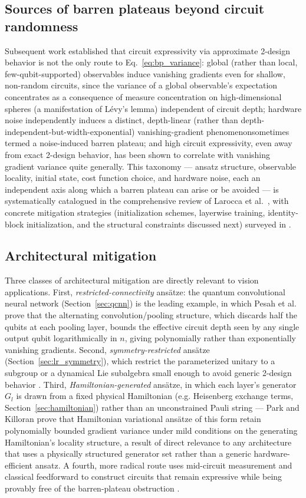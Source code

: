 \documentclass[11pt]{article}
\begin{document}
\subsection{Sources of barren plateaus beyond circuit randomness}
Subsequent work established that circuit expressivity via approximate 2-design behavior is not the only route to Eq.~\eqref{eq:bp_variance}: global (rather than local, few-qubit-supported) observables induce vanishing gradients even for shallow, non-random circuits, since the variance of a global observable's expectation concentrates as a consequence of measure concentration on high-dimensional spheres (a manifestation of L\'evy's lemma) independent of circuit depth; hardware noise independently induces a distinct, depth-linear (rather than depth-independent-but-width-exponential) vanishing-gradient phenomenonsometimes termed a noise-induced barren plateau; and high circuit expressivity, even away from exact 2-design behavior, has been shown to correlate with vanishing gradient variance quite generally. This taxonomy — ansatz structure, observable locality, initial state, cost function choice, and hardware noise, each an independent axis along which a barren plateau can arise or be avoided — is systematically catalogued in the comprehensive review of Larocca et al.\ \cite{Larocca2025}, with concrete mitigation strategies (initialization schemes, layerwise training, identity-block initialization, and the structural constraints discussed next) surveyed in \cite{Cunningham2024}.

\subsection{Architectural mitigation}
Three classes of architectural mitigation are directly relevant to vision applications. First, \emph{restricted-connectivity} ansätze: the quantum convolutional neural network (Section~\ref{sec:qcnn}) is the leading example, in which Pesah et al.\ \cite{Pesah2021} prove that the alternating convolution/pooling structure, which discards half the qubits at each pooling layer, bounds the effective circuit depth seen by any single output qubit logarithmically in $n$, giving polynomially rather than exponentially vanishing gradients. Second, \emph{symmetry-restricted} ansätze (Section~\ref{sec:lr_symmetry}), which restrict the parameterized unitary to a subgroup or a dynamical Lie subalgebra small enough to avoid generic 2-design behavior \cite{West2024,Nguyen2024EQNN,Schatzki2024}. Third, \emph{Hamiltonian-generated} ansätze, in which each layer's generator $G_l$ is drawn from a fixed physical Hamiltonian (e.g. Heisenberg exchange terms, Section~\ref{sec:hamiltonian}) rather than an unconstrained Pauli string — Park and Killoran \cite{Park2024} prove that Hamiltonian variational ansätze of this form retain polynomially bounded gradient variance under mild conditions on the generating Hamiltonian's locality structure, a result of direct relevance to any architecture that uses a physically structured generator set rather than a generic hardware-efficient ansatz. A fourth, more radical route uses mid-circuit measurement and classical feedforward to construct circuits that remain expressive while being provably free of the barren-plateau obstruction \cite{Deshpande2024}.
\end{document}
